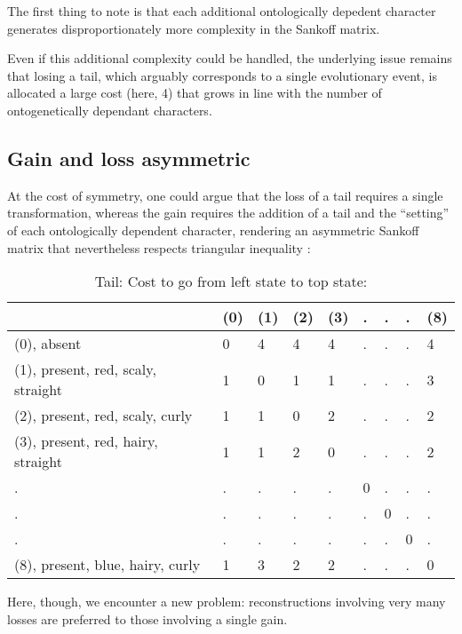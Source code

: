 \documentclass[]{book}
\theoremstyle{definition}
\theoremstyle{definition}
\theoremstyle{definition}
\theoremstyle{remark}
\begin{document}
The first thing to note is that each additional ontologically depedent
character generates disproportionately more complexity in the Sankoff
matrix.

Even if this additional complexity could be handled, the underlying
issue remains that losing a tail, which arguably corresponds to a single
evolutionary event, is allocated a large cost (here, 4) that grows in
line with the number of ontogenetically dependant characters.

\subsection{Gain and loss asymmetric}\label{gain-and-loss-asymmetric}

At the cost of symmetry, one could argue that the loss of a tail
requires a single transformation, whereas the gain requires the addition
of a tail and the ``setting'' of each ontologically dependent character,
rendering an asymmetric Sankoff matrix that nevertheless respects
triangular inequality \citep{Wheeler1993}:

\begin{table}

\caption{\label{tab:unnamed-chunk-21}Tail: Cost to go from left state to top state:}
\centering
\begin{tabular}[t]{l|l|l|l|l|l|l|l|l}
\hline
  & (0) & (1) & (2) & (3) & . & . & . & (8)\\
\hline
(0), absent & 0 & 4 & 4 & 4 & . & . & . & 4\\
\hline
(1), present, red, scaly, straight & 1 & 0 & 1 & 1 & . & . & . & 3\\
\hline
(2), present, red, scaly, curly & 1 & 1 & 0 & 2 & . & . & . & 2\\
\hline
(3), present, red, hairy, straight & 1 & 1 & 2 & 0 & . & . & . & 2\\
\hline
. & . & . & . & . & 0 & . & . & .\\
\hline
. & . & . & . & . & . & 0 & . & .\\
\hline
. & . & . & . & . & . & . & 0 & .\\
\hline
(8), present, blue, hairy, curly & 1 & 3 & 2 & 2 & . & . & . & 0\\
\hline
\end{tabular}
\end{table}

Here, though, we encounter a new problem: reconstructions involving very
many losses are preferred to those involving a single gain.
\end{document}
